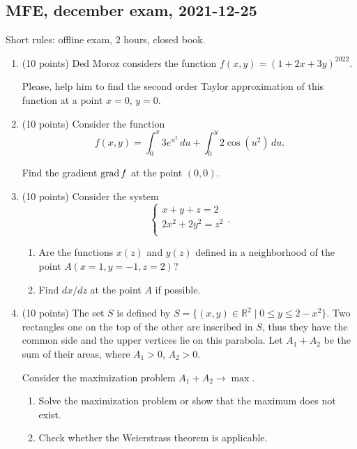 
\subsection{MFE, december exam, 2021-12-25}

Short rules: offline exam, 2 hours, closed book. 

\begin{enumerate}

    \item (10 points) Ded Moroz considers the function $f(x, y) = (1 + 2x + 3y)^{2022}$.
    
    Please, help him to find the second order Taylor approximation of this function at a point $x=0$, $y=0$.
    
    \item (10 points) Consider the function 
    \[
    f(x, y) = \int_0^x 3e^{u^2} \, du  + \int_0^y 2\cos(u^2) \, du.   
    \]
    
    Find the gradient $\mathrm{grad}\, f$ at the point $(0, 0)$.
    
    \item (10 points) Consider the system 
      \[
      \begin{cases}
        x + y + z = 2 \\
        2x^2 + 2y^2 = z^2 \\
      \end{cases}.  
      \]
      \begin{enumerate}
        \item Are the functions $x(z)$ and $y(z)$ defined in a neighborhood of the point $A(x=1, y=-1, z=2)$?
        \item Find $dx/dz$ at the point $A$ if possible. 
      \end{enumerate}
    
    \item (10 points)  
    The set $S$ is defined by $S = \{(x, y) \in \mathbb{R}^2 \mid 0 \leq y \leq 2- x^2\}$. 
    Two rectangles one on the top of the other are inscribed in $S$, 
    thus they have the common side and the upper vertices lie on this parabola.
    Let $A_1 + A_2$ be the sum of their areas, where $A_1 >0$, $A_2 >0$. 
    
    Consider the maximization problem $A_1 + A_2 \to \max$.
    \begin{enumerate}
      \item Solve the maximization problem or show that the maximum does not exist.
      \item Check whether the Weierstrass theorem is applicable.
    \end{enumerate}
    

\end{enumerate}
